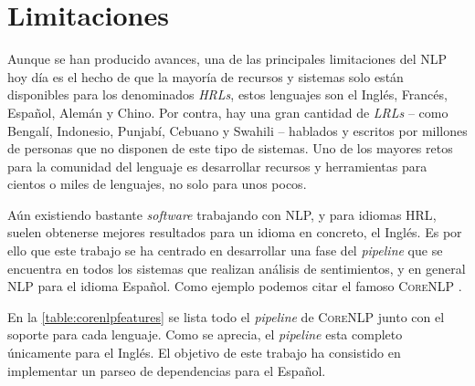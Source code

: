 \section{Limitaciones}
\label{sec:nlplimits}

Aunque se han producido avances, una de las principales limitaciones del
\ac{NLP} hoy día es el hecho de que la mayoría de recursos y sistemas solo están
disponibles para los denominados \emph{\acp{HRL}}, estos lenguajes son el Inglés, Francés, Español, Alemán y
Chino. Por contra, hay una gran cantidad de \emph{\acp{LRL}}
-- como Bengalí, Indonesio,
Punjabí, Cebuano y Swahili -- hablados y escritos por millones de personas que
no disponen de este tipo de sistemas. Uno de los mayores retos para la comunidad
del lenguaje es desarrollar recursos y herramientas para cientos o miles de
lenguajes, no solo para unos pocos.

Aún existiendo bastante \emph{software} trabajando con \ac{NLP}, y para idiomas
\ac{HRL}, suelen obtenerse mejores resultados para un idioma en concreto, el
Inglés. Es por ello que este trabajo se ha centrado en desarrollar una fase del
\emph{pipeline} que se encuentra en todos los sistemas que realizan análisis de
sentimientos, y en general \ac{NLP} para el idioma Español. Como ejemplo podemos
citar el famoso \textsc{CoreNLP} \cite{Manning2014}.

En la \autoref{table:corenlpfeatures} se lista todo el \emph{pipeline} de
\textsc{CoreNLP} junto con el soporte para cada lenguaje. Como se aprecia, el
\emph{pipeline} esta completo únicamente para el Inglés. El objetivo de este
trabajo ha consistido en implementar un parseo de dependencias para el Español.

\newcommand*{\checktikz}[1][]{\tikz[x=1em, y=1em]\fill[#1] (0,.35) -- (.25,0) --
  (1,.7) -- (.25,.15) -- cycle;}
\newcommand*{\ccheck}{\checktikz[tick,rounded corners=.5pt, draw=tick,
  thin]} %


